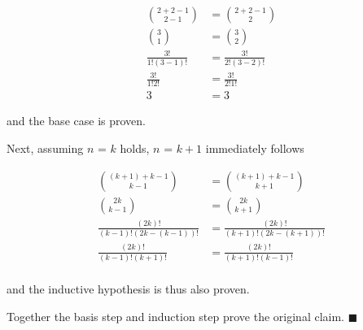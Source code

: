 \begin{align*}
\binom{2 + 2 - 1}{2 - 1} &= \binom{2 + 2 - 1}{2} \\
\binom{3}{1} &= \binom{3}{2} \\
\frac{3!}{1!(3-1)!} &= \frac{3!}{2!(3-2)!} \\
\frac{3!}{1!2!} &= \frac{3!}{2!1!} \\
3 &= 3
\end{align*}

\noindent and the base case is proven.

Next, assuming $n$ = $k$ holds,  $n$ = $k + 1$ immediately follows

\begin{align*}
\binom{(k + 1) + k - 1}{k - 1} &= \binom{(k + 1) + k - 1}{k + 1} \\
\binom{2k}{k - 1} &= \binom{2k}{k + 1} \\
\frac{(2k)!}{(k - 1)!(2k - (k - 1))!} &= \frac{(2k)!}{(k + 1)!(2k - (k + 1))!} \\
\frac{(2k)!}{(k - 1)!(k + 1)!} &= \frac{(2k)!}{(k + 1)!(k - 1)!} \\
\end{align*}

\noindent and the inductive hypothesis is thus also proven.  

Together the basis step and induction step prove the original claim. $\blacksquare$ 


